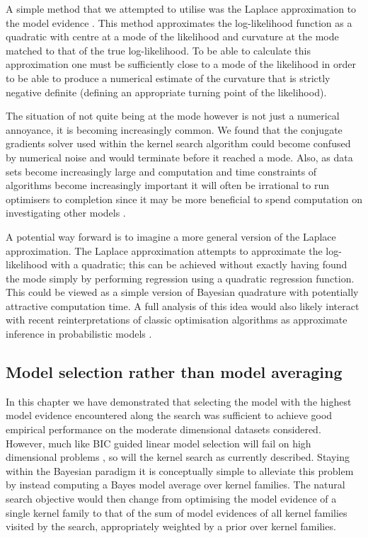 A simple method that we attempted to utilise was the Laplace approximation to the model evidence \citep[e.g.][]{Bishop2006-yy}.
This method approximates the log-likelihood function as a quadratic with centre at a mode of the likelihood and curvature at the mode matched to that of the true log-likelihood.
To be able to calculate this approximation one must be sufficiently close to a mode of the likelihood in order to be able to produce a numerical estimate of the curvature that is strictly negative definite (\ie defining an appropriate turning point of the likelihood).

The situation of not quite being at the mode however is not just a numerical annoyance, it is becoming increasingly common.
We found that the conjugate gradients solver used within the kernel search algorithm could become confused by numerical noise and would terminate before it reached a mode.
Also, as data sets become increasingly large and computation and time constraints of algorithms become increasingly important it will often be irrational to run optimisers to completion since it may be more beneficial to spend computation on investigating other models \citep[e.g.][]{Swersky2014-aw}.

A potential way forward is to imagine a more general version of the Laplace approximation.
The Laplace approximation attempts to approximate the log-likelihood with a quadratic; this can be achieved without exactly having found the mode simply by performing regression using a quadratic regression function.
This could be viewed as a simple version of Bayesian quadrature \citep[e.g.][]{Ghahramani2002-by, OHagan1991-wg} with potentially attractive computation time.
A full analysis of this idea would also likely interact with recent reinterpretations of classic optimisation algorithms as approximate inference in probabilistic models \citep[e.g.][]{Hennig2012-wv}.

\subsection{Model selection rather than model averaging}

In this chapter we have demonstrated that selecting the model with the highest model evidence encountered along the search was sufficient to achieve good empirical performance on the moderate dimensional datasets considered.
However, much like BIC guided linear model selection will fail on high dimensional problems \citep[e.g.][]{Hastie2009-hj}, so will the kernel search as currently described.
Staying within the Bayesian paradigm it is conceptually simple to alleviate this problem by instead computing a Bayes model average \citep[e.g.][]{Hoeting1999-tn} over kernel families.
The natural search objective would then change from optimising the model evidence of a single kernel family to that of the sum of model evidences of all kernel families visited by the search, appropriately weighted by a prior over kernel families.

\outbpdocument{


}

